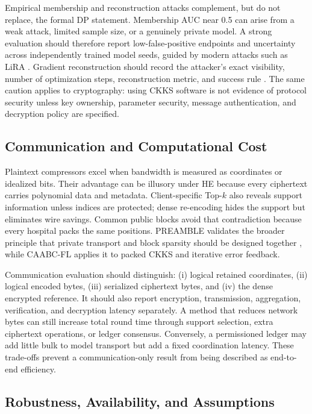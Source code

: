 Empirical membership and reconstruction attacks complement, but do not replace, the formal DP statement. Membership AUC near 0.5 can arise from a weak attack, limited sample size, or a genuinely private model. A strong evaluation should therefore report low-false-positive endpoints and uncertainty across independently trained model seeds, guided by modern attacks such as LiRA \cite{carlini2022membership}. Gradient reconstruction should record the attacker's exact visibility, number of optimization steps, reconstruction metric, and success rule \cite{zhu2019dlg,geiping2020inverting}. The same caution applies to cryptography: using CKKS software is not evidence of protocol security unless key ownership, parameter security, message authentication, and decryption policy are specified.

\subsection{Communication and Computational Cost}

Plaintext compressors excel when bandwidth is measured as coordinates or idealized bits. Their advantage can be illusory under HE because every ciphertext carries polynomial data and metadata. Client-specific Top-$k$ also reveals support information unless indices are protected; dense re-encoding hides the support but eliminates wire savings. Common public blocks avoid that contradiction because every hospital packs the same positions. PREAMBLE validates the broader principle that private transport and block sparsity should be designed together \cite{asi2025preamble}, while CAABC-FL applies it to packed CKKS and iterative error feedback.

Communication evaluation should distinguish: (i) logical retained coordinates, (ii) logical encoded bytes, (iii) serialized ciphertext bytes, and (iv) the dense encrypted reference. It should also report encryption, transmission, aggregation, verification, and decryption latency separately. A method that reduces network bytes can still increase total round time through support selection, extra ciphertext operations, or ledger consensus. Conversely, a permissioned ledger may add little bulk to model transport but add a fixed coordination latency. These trade-offs prevent a communication-only result from being described as end-to-end efficiency.

\subsection{Robustness, Availability, and Assumptions}


